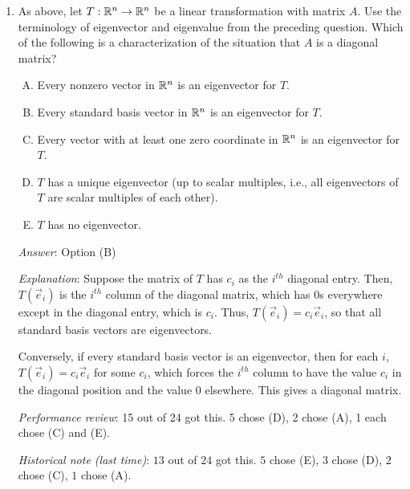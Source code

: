 \documentclass[10pt]{amsart}
\begin{document}
\begin{enumerate}
\begin{itemize}
    In fact, Option (E) holds true if and only if $\lambda = 0$.
  \end{itemize}

  {\em Performance review}: 14 out of 24 got this. 4 chose (E), 3
  chose (B), 2 chose (A), 1 chose (D).

  {\em Historical note (last time)}: $17$ out of $24$ got this. $4$ chose (A),
  $2$ chose (B), $1$ chose (E).

\item As above, let $T: \mathbb{R}^n \to \mathbb{R}^n$ be a linear transformation with
  matrix $A$. Use the terminology of eigenvector and eigenvalue from
  the preceding question. Which of the following is a characterization
  of the situation that $A$ is a diagonal matrix?

  \begin{enumerate}[(A)]
  \item Every nonzero vector in $\mathbb{R}^n$ is an eigenvector for $T$.
  \item Every standard basis vector in $\mathbb{R}^n$ is an eigenvector for $T$.
  \item Every vector with at least one zero coordinate in $\mathbb{R}^n$ is an
    eigenvector for $T$.
  \item $T$ has a unique eigenvector (up to scalar multiples, i.e.,
    all eigenvectors of $T$ are scalar multiples of each other).
  \item $T$ has no eigenvector.
  \end{enumerate}

  {\em Answer}: Option (B)

  {\em Explanation}: Suppose the matrix of $T$ has $c_i$ as the
  $i^{th}$ diagonal entry. Then, $T(\vec{e}_i)$ is the $i^{th}$ column
  of the diagonal matrix, which has $0$s everywhere except in the
  diagonal entry, which is $c_i$. Thus, $T(\vec{e}_i) = c_i\vec{e}_i$,
  so that all standard basis vectors are eigenvectors.

  Conversely, if every standard basis vector is an eigenvector, then
  for each $i$, $T(\vec{e}_i) = c_i\vec{e}_i$ for some $c_i$, which
  forces the $i^{th}$ column to have the value $c_i$ in the diagonal
  position and the value $0$ elsewhere. This gives a diagonal matrix.

  {\em Performance review}: 15 out of 24 got this. 5 chose (D), 2
  chose (A), 1 each chose (C) and (E).

  {\em Historical note (last time)}: $13$ out of $24$ got this. $5$ chose (E),
  $3$ chose (D), $2$ chose (C), $1$ chose (A).


\end{enumerate}
\end{document}
